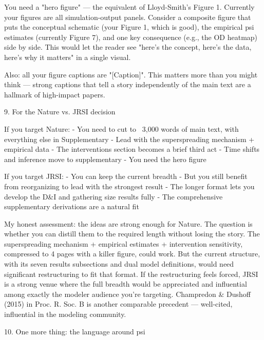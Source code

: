   You need a "hero figure" --- the equivalent of Lloyd-Smith's Figure 1. Currently your figures are
  all simulation-output panels. Consider a composite figure that puts the conceptual schematic (your
  Figure 1, which is good), the empirical psi estimates (currently Figure 7), and one key consequence
   (e.g., the OD heatmap) side by side. This would let the reader see "here's the concept, here's the
   data, here's why it matters" in a single visual.

  Also: all your figure captions are "[Caption]". This matters more than you might think --- strong
  captions that tell a story independently of the main text are a hallmark of high-impact papers.

  9. For the Nature vs. JRSI decision

  If you target Nature:
  - You need to cut to ~3,000 words of main text, with everything else in Supplementary
  - Lead with the superspreading mechanism + empirical data
  - The interventions section becomes a brief third act
  - Time shifts and inference move to supplementary
  - You need the hero figure

  If you target JRSI:
  - You can keep the current breadth
  - But you still benefit from reorganizing to lead with the strongest result
  - The longer format lets you develop the D&I and gathering size results fully
  - The comprehensive supplementary derivations are a natural fit

  My honest assessment: the ideas are strong enough for Nature. The question is whether you can
  distill them to the required length without losing the story. The superspreading mechanism +
  empirical estimates + intervention sensitivity, compressed to 4 pages with a killer figure, could
  work. But the current structure, with its seven results subsections and dual model definitions,
  would need significant restructuring to fit that format. If the restructuring feels forced, JRSI is
   a strong venue where the full breadth would be appreciated and influential among exactly the
  modeler audience you're targeting. Champredon & Dushoff (2015) in Proc. R. Soc. B is another
  comparable precedent --- well-cited, influential in the modeling community.

  10. One more thing: the language around psi

